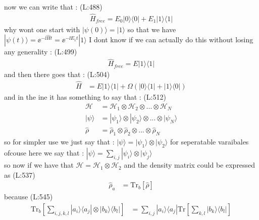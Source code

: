  now we can write that : 
(L:488)
\begin{equation}
\begin{split}
\hat{H }_{free}=E _{0}|0\rangle \langle 0|+E _{1}|1\rangle \langle 1|\end{split}
\end{equation}
 why wont one start with 
 $ |\psi (0)\rangle =|1\rangle  $  so that we have 
 $ |\psi (t )\rangle =\ee ^{-\ii \hat{H }t }=\ee ^{-\ii E _{1}t }|1\rangle  $  I dont know if we can actually do this without losing any generality : 
(L:499)
\begin{equation}
\begin{split}
\hat{H }_{free}=E |1\rangle \langle 1|\end{split}
\end{equation}
 and then there goes that : 
(L:504)
\begin{equation}
\begin{split}
\hat{H }&=E |1\rangle \langle 1|+\Omega (|0\rangle \langle 1|+|1\rangle \langle 0|)\end{split}
\end{equation}
 and in the ine it has something to say that : 
(L:512)
\begin{equation}
\begin{split}
\mathcal{H }&=\mathcal{H }_{1}\otimes \mathcal{H }_{2}\otimes ...\otimes \mathcal{H }_{N }\\
|\psi \rangle &=|\psi _{1}\rangle \otimes |\psi _{2}\rangle \otimes ...\otimes |\psi _{N }\rangle \\
\hat{\rho }&=\hat{\rho }_{1}\otimes \hat{\rho }_{2}\otimes ...\otimes \hat{\rho }_{N }\end{split}
\end{equation}
 so for simpler use we just say that : 
 $ |\psi \rangle =|\psi _{1}\rangle \otimes |\psi _{2}\rangle  $  for seperatable varaibales ofcouse here we say that : 
 $ |\psi \rangle =\sum _{i ,j }|\psi _{i }\rangle \otimes |\psi _{j }\rangle  $  \\
 so now if we have that
 $ \mathcal{H }=\mathcal{H }_{1}\otimes \mathcal{H }_{2} $  and the density matrix could be expressed as 
(L:537)
\begin{equation}
\begin{split}
\hat{\rho }_{a }&=\text{Tr}_{b }[\hat{\rho }]\end{split}
\end{equation}
 because 
(L:545)
\begin{equation}
\begin{split}
\text{Tr}_{b }\left[\sum _{i ,j ,k ,l }|a _{i }\rangle \langle a _{j }|\otimes |b _{k }\rangle \langle b _{l }|\right]&=\sum _{i ,j }|a _{i }\rangle \langle a _{j }|\text{Tr}\left[\sum _{k ,l }|b _{k }\rangle \langle b _{l }|\right]\end{split}
\end{equation}
